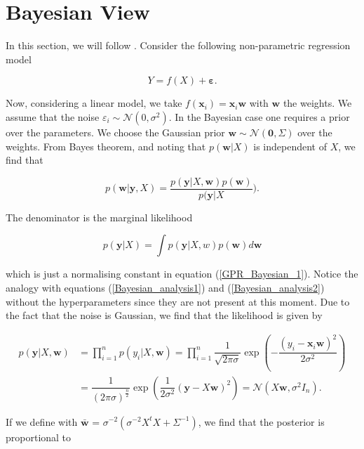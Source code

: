 \documentclass[12pt,a4paper,oneside]{book}
\begin{document}
\section{Bayesian View} \label{section_bayesian_view}


In this section, we will follow \cite{GPRbook}. Consider the following non-parametric regression model

\begin{equation}\label{GPR_Bayesian_5}
Y = f(X) + \bm{\varepsilon}.
\end{equation}

Now, considering a linear model, we take $f(\bm{x}_i) = \bm{x}_i \bm{w}$ with $\bm{w}$ the weights. We assume that the noise $\varepsilon_i \sim \mathcal{N}(0,\sigma^2)$. In the Bayesian case one requires a prior over the parameters. We choose the Gaussian prior $\bm{w} \sim \mathcal{N}(\bm{0},\Sigma)$ over the weights. From Bayes theorem, and noting that $p(\bm{w}|X)$ is independent of $X$, we find that 

\begin{equation}\label{GPR_Bayesian_1}
p(\bm{w}|\bm{y},X) = \dfrac{p(\bm{y}|X,\bm{w}) p(\bm{w})}{p(\bm{y} | X}).
\end{equation}

The denominator is the marginal likelihood 

\begin{equation}
p(\bm{y}|X) = \int p(\bm{y}|X,w)p(\bm{w})d\bm{w}
\end{equation}

which is just a normalising constant in equation (\ref{GPR_Bayesian_1}). Notice the analogy with equations (\ref{Bayesian_analysis1}) and (\ref{Bayesian_analysis2}) without the  hyperparameters since they are not present at this moment.   Due to the fact that the noise is Gaussian, we find that the likelihood is given by 

\begin{align}\label{GPR_Bayesian_4}
p(\bm{y}|X,\bm{w}) &= \prod_{i=1}^{n} p(y_i|X, \bm{w}) = \prod_{i=1}^{n} \dfrac{1}{\sqrt{2 \pi \sigma}} \exp\left(-\dfrac{(y_i - \bm{x}_i \bm{w})^2}{2 \sigma^2} \right) \nonumber \\ 
&= \dfrac{1}{(2 \pi \sigma)^{\frac{n}{2}}} \exp\left(\dfrac{1}{2 \sigma^2} (\bm{y} - X \bm{w} )^2 \right) = \mathcal{N}(X \bm{w},\sigma^2 I_n).
\end{align}

If we define with $ \bar{\bm{w}}$ = $\sigma^{-2}(\sigma^{-2} X^tX + \Sigma^{-1})$, we find that the posterior is proportional to 
\end{document}
